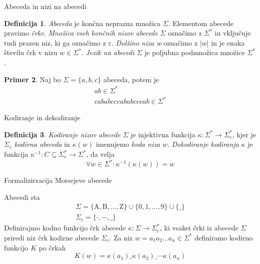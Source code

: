 \documentclass{beamer}
\theoremstyle{definition} %
\newtheorem{definicija}{Definicija}[section]
\newtheorem{primer}[definicija]{Primer}
\theoremstyle{plain} %
\begin{document}
\begin{frame}{Abeceda in nizi na abecedi}
    
    \begin{definicija}

        \textit{Abeceda} je končna neprazna množica $ \Sigma $. Elementom abecede pravimo \textit{črke}.
        \textit{Množica vseh končnih nizov abecede} $ \Sigma $ označimo z $ \Sigma^* $ in vključuje tudi
        prazen niz, ki ga označimo z $ \varepsilon $. \textit{Dolžino niza w} označimo z $ |w| $ in je 
        enaka številu črk v nizu $ w \in \Sigma^* $. \textit{Jezik na abecedi} $ \Sigma $ je poljubna
        podmnožica množice $ \Sigma^* $. 
    
    \end{definicija}

    \pause
    
    \begin{primer}

    Naj bo $ \Sigma = \{ a,b,c \} $ abeceda, potem je
    \begin{gather*} 
        ab \in \Sigma^* \\
        cababcccababcccab \in \Sigma^*
    \end{gather*}

    \end{primer}

\end{frame}

\begin{frame}{Kodiranje in dekodiranje}
    
    \begin{definicija}
    
        \textit{Kodiranje nizov abecede} $ \Sigma $ je injektivna funkcija $ \kappa \colon \Sigma^* 
        \to \Sigma_c^* $, kjer je $ \Sigma_c $ \textit{kodirna abeceda} in $ \kappa(w) $ imenujemo
        \textit{koda niza} $ w $. \textit{Dokodiranje kodiranja} $ \kappa $ je funkcija 
        $ \kappa^{-1} \colon C \subseteq \Sigma^*_c \to \Sigma^* $, da velja
        \[
            \forall w \in \Sigma^* \colon \kappa^{-1}(\kappa(w)) = w
        \]
    
    \end{definicija}

\end{frame}

\begin{frame}{Formalizirzacija Morsejeve abecede}

    Abecedi sta
    \begin{gather*}
        \Sigma = \{ \text{A},  \text{B}, \ldots, \text{Z} \} \cup \{ 0, 1, \ldots, 9 \} \cup \{ \_ \} \\
        \Sigma_c = \{ \cdot ,-, \_ \}
    \end{gather*}
    Definirajmo kodno funkcijo črk abecede $ \kappa \colon \Sigma \to \Sigma_c^* $, ki vsakei črki iz abecede
    $ \Sigma $ priredi niz črk kodirne abecede $ \Sigma_c $. Za niz $ w = a_1a_2 \ldots a_n \in \Sigma^* $
    definiramo kodirno funkcijo $ K $ po črkah
    \[
        K(w) = \kappa(a_1)\_\kappa(a_2)\_\cdots\kappa(a_n)
    \]

\end{frame}
\end{document}
